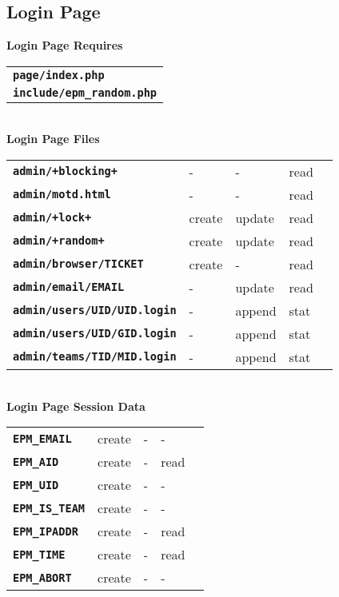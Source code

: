 \documentclass[12pt]{article}
\newcommand{\TT}[1]{{\tt \bfseries #1}}
\begin{document}
\subsection{Login Page}

\begin{center}
{\bf Login Page Requires}
\\[1ex]
\begin{tabular}{l}
\TT{page/index.php} \\
\TT{include/epm\_random.php} \\
\end{tabular}
\\[3ex]
{\bf Login Page Files}
\\[1ex]
\begin{tabular}{lllll}
\TT{admin/+blocking+}		& -	  & -      & read \\
\TT{admin/motd.html}		& -	  & -      & read \\
\TT{admin/+lock+}		& create  & update & read \\
\TT{admin/+random+}		& create  & update & read
\\[2ex]
\TT{admin/browser/TICKET}	& create  & -      & read \\
\TT{admin/email/EMAIL}		& -       & update & read \\
\TT{admin/users/UID/UID.login}	& -       & append & stat \\
\TT{admin/users/UID/GID.login}	& -       & append & stat \\
\TT{admin/teams/TID/MID.login}	& -       & append & stat \\
\end{tabular}
\\[3ex]
{\bf Login Page Session Data}
\\[1ex]
\begin{tabular}{lllll}
\TT{EPM\_EMAIL}	& create  & -      & - \\
\TT{EPM\_AID}	& create  & -      & read    \\
\TT{EPM\_UID}	& create  & -      & -    \\
\TT{EPM\_IS\_TEAM}
		& create  & -      & -    \\
\TT{EPM\_IPADDR}& create  & -      & read \\
\TT{EPM\_TIME}
                & create  & -      & read \\
\TT{EPM\_ABORT}
                & create  & -      & - \\
\end{tabular}
\end{center}
\end{document}
